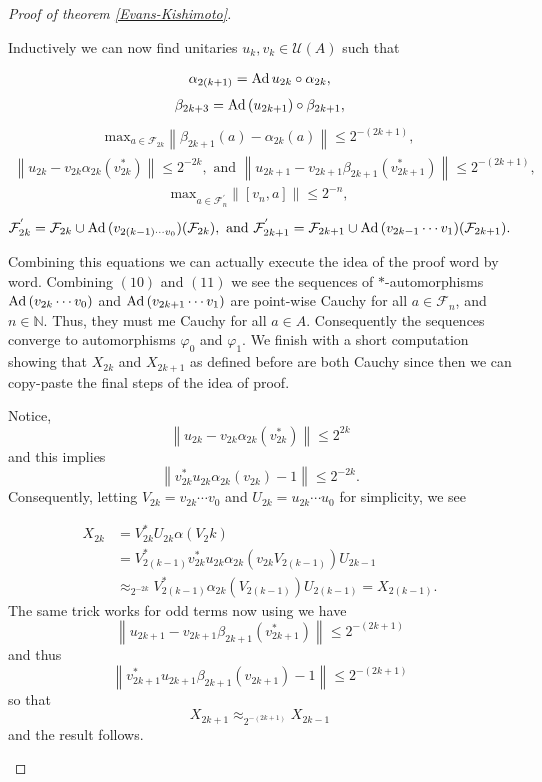 \documentclass[11pt,a4paper,oneside]{amsart}
\newcommand{\Ad}{{\rm Ad\,}}
\newcommand{\norm}[1]{\left\|#1\right\|} %
\begin{document}
\begin{proof}[Proof of theorem \ref{Evans-Kishimoto}]
\begin{enumerate}
Inductively we can now find unitaries $u_k, v_k \in \mathcal U(A)$ such that 

\begin{align}
\alpha_{2(k+1)}=\Ad u_ {2k}\circ \alpha_{2k},
\end{align}  
\begin{align}
\beta_{2k+3}=\Ad (u_{2k+1})\circ \beta_{2k+1},
\end{align}
\begin{align}
\mathrm{max}_{a\in \mathcal F_{2k}}\norm{\beta_{2k+1}(a)-\alpha_{2k}(a)}\leq 2^{-(2k+1)},
\end{align}
\begin{align}
\norm{u_{2k}-v_{2k}\alpha_{2k}(v_{2k}^*)}\leq 2^{-2k}, \text{ and } \norm{u_{2k+1}- v_{2k+1}\beta_{2k+1}(v_{2k+1}^*)}\leq 2 ^{-(2k+1)},
\end{align}
\begin{align}
\mathrm{max}_{a\in \mathcal F_n^{'}}\norm{[v_n,a]}\leq 2^{-n},
\end{align}
\begin{align}
\mathcal F_{2k}^{'}=\mathcal F_{2k}\cup \Ad(v_{2(k-1)\cdots v_0})(\mathcal F_{2k}), \text{ and } \mathcal F_{2k+1}^{'}= \mathcal F_{2k+1}\cup \Ad(v_{2k-1}\cdots v_1)(\mathcal F_{2k+1}). 
\end{align}

Combining this equations we can actually execute the idea of the proof word by word. Combining $(10)$ and $(11)$ we see the sequences of $*$-automorphisms $\Ad (v_{2k}\cdots v_0)$ and $\Ad (v_{2k+1}\cdots v_1)$ are point-wise Cauchy for all $a\in \mathcal F_n$, and $n\in \mathbb{N}$. Thus, they must me Cauchy for all $a\in A$. Consequently the sequences converge to automorphisms $\varphi_0$ and $\varphi_1$. We finish with a short computation showing that $X_{2k}$ and $X_{2k+1}$ as defined before are both Cauchy since then we can copy-paste the final steps of the idea of proof.      

Notice, $$\norm{u_{2k}-v_{2k}\alpha_{2k}(v_{2k}^*)}\leq 2^{2k}$$and this implies$$\norm{v^*_{2k}u_{2k}\alpha_{2k}(v_{2k})-1}\leq 2^{-2k}.$$ Consequently, letting $V_{2k}=v_{2k}\cdots v_0$ and $U_{2k}= u_{2k}\cdots u_0$ for simplicity, we see


\begin{align*}
X_{2k}& =V^*_{2k}U_{2k}\alpha(V_2k)\\ &= V^*_{2(k-1)}v^*_{2k}u_{2k}\alpha_{2k}(v_{2k}V_{2(k-1)})U_{2k-1}\\& \approx_{2^{-2k}} V^*_{2(k-1)}\alpha_{2k}(V_{2(k-1)})U_{2(k-1)}=X_{2(k-1)}.
\end{align*}
The same trick works for odd terms now using we have$$\norm{u_{2k+1}-v_{2k+1}\beta_{2k+1}(v_{2k+1}^*)}\leq 2^{-(2k+1)}$$and thus$$\norm{v_{2k+1}^*u_{2k+1}\beta_{2k+1}(v_{2k+1})-1}\leq 2^{-(2k+1)}$$ so that $$X_{2k+1}\approx_{2^{-(2k+1)}} X_{2k-1}$$ and the result follows. 
\end{enumerate}

\end{proof}
\end{document}
